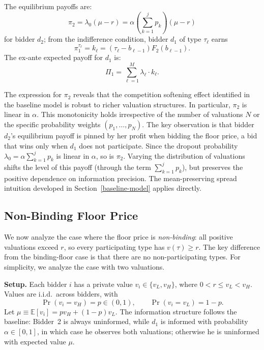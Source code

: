 \documentclass[11pt]{article}
\theoremstyle{plain}
\theoremstyle{definition}
\theoremstyle{plain}
\theoremstyle{plain}
\theoremstyle{plain}
\theoremstyle{plain}
\numberwithin{equation}{section}
\begin{document}
\vspace{0.4cm}

\noindent The equilibrium payoffs are:
\[
\pi_2 = \lambda_0 (\mu - r) = \alpha \left( \sum_{k=1}^{j} p_k \right) (\mu - r)
\]
for bidder $d_2$; from the indifference condition, bidder $d_1$ of type $\tau_\ell$ earns
\[
\pi_1^{\tau_\ell} = k_\ell = (\tau_\ell - b_{\ell-1}) F_2(b_{\ell-1}).
\]
\noindent The ex-ante expected payoff for $d_1$ is:
\[
\Pi_1 = \sum_{\ell=1}^{M} \lambda_\ell \cdot k_\ell.
\]

\vspace{2mm}

\noindent The expression for $\pi_2$ reveals that the competition softening effect identified in the baseline model is robust to richer valuation structures. In particular, $\pi_2$ is linear in $\alpha$. This monotonicity holds irrespective of the number of valuations $N$ or the specific probability weights $(p_1, \ldots, p_N)$. The key observation is that bidder $d_2$'s equilibrium payoff is pinned by her profit when bidding the floor price, a bid that wins only when $d_1$ does not participate. Since the dropout probability $\lambda_0 = \alpha \sum_{k=1}^{j} p_k$ is linear in $\alpha$, so is $\pi_2$. Varying the distribution of valuations shifts the level of this payoff (through the term $\sum_{k=1}^{j} p_k$), but preserves the positive dependence on information precision. The mean-preserving spread intuition developed in Section~\ref{baseline-model} applies directly.

\vspace{0.4cm} 
\subsection{Non-Binding Floor Price}\label{sect:nonbinding-floor}
We now analyze the case where the floor price is \textit{non-binding}: all positive valuations exceed $r$, so every participating type has $v(\tau) \geq r$. The key difference from the binding-floor case is that there are no non-participating types. For simplicity, we analyze the case with two valuations.

\vspace{0.3cm}

\noindent \textbf{Setup.} Each bidder $i$ has a private value $v_i \in \{v_L, v_H\}$, where $0 < r \leq v_L < v_H$. Values are i.i.d.\ across bidders, with
\[
\Pr(v_i = v_H) = p \in (0,1), \qquad \Pr(v_i = v_L) = 1 - p.
\]
Let $\mu \equiv \mathbb{E}[v_i] = pv_H + (1-p)v_L$. The information structure follows the baseline: Bidder~2 is always uninformed, while $d_1$ is informed with probability $\alpha \in [0,1]$, in which case he observes both valuations; otherwise he is uninformed with expected value $\mu$.
\end{document}
